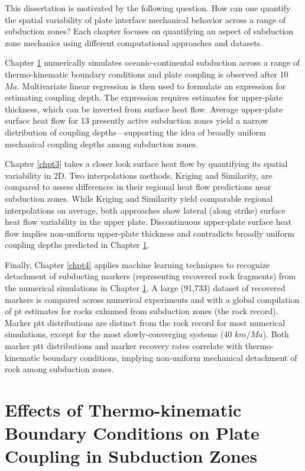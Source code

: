 This dissertation is motivated by the following question. How can one quantify the spatial variability of plate interface mechanical behavior across a range of subduction zones? Each chapter focuses on quantifying an aspect of subduction zone mechanics using different computational approaches and datasets.

Chapter \ref{chpt2} numerically simulates oceanic-continental subduction across a range of thermo-kinematic boundary conditions and plate coupling is observed after 10 \(Ma\). Multivariate linear regression is then used to formulate an expression for estimating coupling depth. The expression requires estimates for upper-plate thickness, which can be inverted from surface heat flow. Average upper-plate surface heat flow for 13 presently active subduction zones yield a narrow distribution of coupling depths---supporting the idea of broadly uniform mechanical coupling depths among subduction zones.

Chapter \ref{chpt3} takes a closer look surface heat flow by quantifying its spatial variability in 2D. Two interpolations methods, Kriging and Similarity, are compared to assess differences in their regional heat flow predictions near subduction zones. While Kriging and Similarity yield comparable regional interpolations on average, both approaches show lateral (along strike) surface heat flow variability in the upper plate. Discontinuous upper-plate surface heat flow implies non-uniform upper-plate thickness and contradicts broadly uniform coupling depths predicted in Chapter \ref{chpt2}.

Finally, Chapter \ref{chpt4} applies machine learning techniques to recognize detachment of subducting markers (representing recovered rock fragments) from the numerical simulations in Chapter \ref{chpt2}. A large (91,733)  dataset of recovered markers is compared across numerical experiments and with a global compilation of \gls{pt} estimates for rocks exhumed from subduction zones (the rock record). Marker \gls{ptt} distributions are distinct from the rock record for most numerical simulations, except for the most slowly-converging systems (40 \(km/Ma\)). Both marker \gls{ptt} distributions and marker recovery rates correlate with thermo-kinematic boundary conditions, implying non-uniform mechanical detachment of rock among subduction zones.

\cleardoublepage

\hypertarget{chpt2}{%
\chapter{Effects of Thermo-kinematic Boundary Conditions on Plate Coupling in Subduction Zones}\label{chpt2}}

